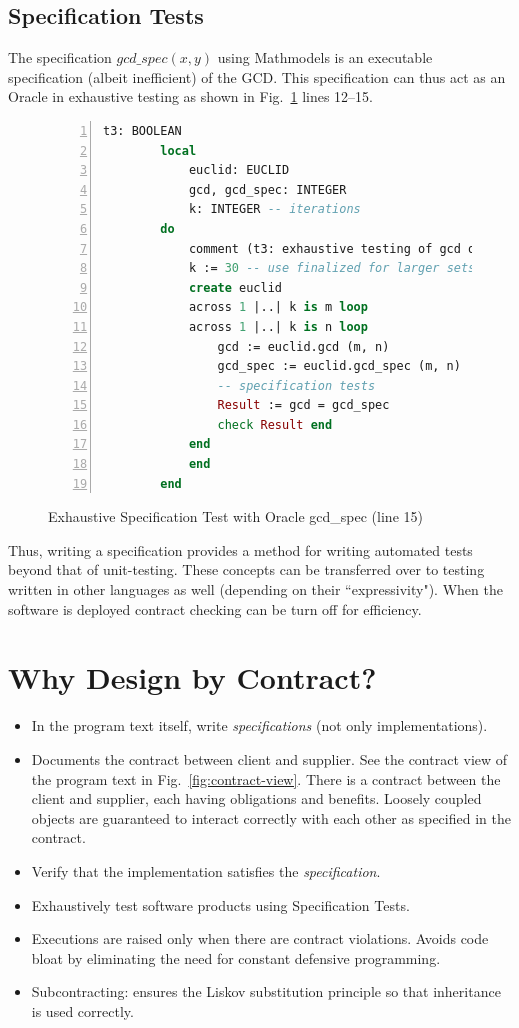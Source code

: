 \documentclass[runningheads,12pt]{article}
\begin{document}
\subsection{Specification Tests}

The specification $gcd\_spec(x,y)$ using Mathmodels is an executable specification (albeit inefficient) of the GCD. This specification can thus act as an Oracle in exhaustive testing as shown in Fig.~\ref{fig:spec-test} lines 12--15.

\begin{figure}[!htb]
\begin{framed}
\caption{Exhaustive Specification Test with Oracle gcd\_spec (line 15)}
\label{fig:spec-test}    
\begin{lstlisting}[language=eiffel,numbers=left,firstnumber=1]
	t3: BOOLEAN
		local
			euclid: EUCLID
			gcd, gcd_spec: INTEGER
			k: INTEGER -- iterations
		do
			comment (t3: exhaustive testing of gcd over 30 x 30)
			k := 30 -- use finalized for larger sets
			create euclid
			across 1 |..| k is m loop
			across 1 |..| k is n loop
				gcd := euclid.gcd (m, n)
				gcd_spec := euclid.gcd_spec (m, n)
				-- specification tests
 				Result := gcd = gcd_spec
 				check Result end
 			end
 			end
		end
\end{lstlisting}
\end{framed}
\end{figure}

Thus, writing a specification provides a method for writing automated tests beyond that of unit-testing. These concepts can be transferred over to testing written in other languages as well (depending on their ``expressivity"). When the software is deployed contract checking can be turn off for efficiency.

\section{Why Design by Contract?}

\begin{itemize}
  \item In the program text itself, write \textit{specifications} (not only implementations). 
  \item Documents the contract between client and supplier. See the contract view of the program text in Fig.~\ref{fig:contract-view}. There is a contract between the client and supplier, each having obligations and benefits. Loosely coupled objects are guaranteed to interact correctly with each other as specified in the contract.
  \item Verify that the implementation satisfies the \textit{specification}.
  \item Exhaustively test software products using Specification Tests. 
  \item Executions are raised only when there are contract violations. Avoids code bloat by eliminating the need for constant defensive programming. 
  \item  Subcontracting: ensures the Liskov substitution principle so that inheritance is used correctly. 
  \end{itemize}
\end{document}
